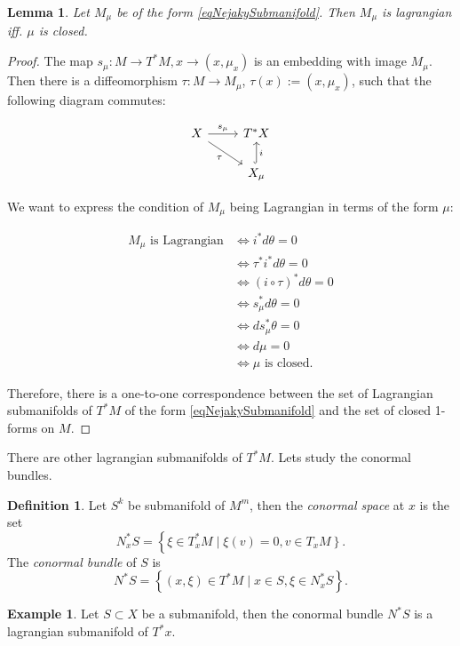 \documentclass{article}
\newtheorem{lemma}[theorem]{Lemma} %
\theoremstyle{definition}
\newtheorem{definition}[theorem]{Definition}
\newtheorem{example}[theorem]{Example}
\begin{document}
\begin{lemma}
    Let $M_\mu$ be of the form \eqref{eqNejakySubmanifold}. Then $M_\mu$ is lagrangian iff. $\mu$ is closed.
\end{lemma}
\begin{proof}
    The map $s_\mu : M \rightarrow T^*M, x \rightarrow (x, \mu_x)$ is an embedding with image $M_\mu$. Then there is a diffeomorphism \( \tau: M \to M_\mu \), \( \tau(x) := (x, \mu_x) \), such that the following diagram commutes:

    \[
    \begin{tikzcd}
        X \arrow[r, "s_\mu"] \arrow[dr, "\tau"'] & T^*X \\
        & X_\mu \arrow[u, hook, "i"']
    \end{tikzcd}
    \]
    
    We want to express the condition of \( M_\mu \) being Lagrangian in terms of the form \( \mu \):

    \begin{equation}
        \begin{aligned}
        M_\mu \text{ is Lagrangian} 
        &\iff i^* d\theta = 0 \\
        &\iff \tau^* i^* d\theta = 0 \\
        &\iff (i \circ \tau)^* d\theta = 0 \\
        &\iff s_\mu^* d\theta = 0 \\
        &\iff d s_\mu^* \theta = 0 \\
        &\iff d\mu = 0 \\
        &\iff \mu \text{ is closed.}
        \end{aligned}
    \end{equation}

    Therefore, there is a one-to-one correspondence between the set of Lagrangian submanifolds of $T^*M$ of the form \eqref{eqNejakySubmanifold} and the set of closed 1-forms on $M$.
\end{proof}

There are other lagrangian submanifolds of $T^*M$. Lets study the conormal bundles.

\begin{definition}
    Let $S^k$ be submanifold of $M^m$, then the \textit{conormal space} at $x$ is the set
    \begin{equation*}
        N_x^* S=\left\{\xi \in T_x^* M \mid \xi(v)=0\right., \left.v \in T_x M\right\}.
    \end{equation*}
    The \textit{conormal bundle} of $S$ is 
    \begin{equation*}
        N^* S=\left\{(x, \xi) \in T^* M \mid x \in S, \xi \in N_x^* S\right\}.
    \end{equation*}
\end{definition}
\begin{example}
    Let $S \subset X$ be a submanifold, then the conormal bundle $N^*S$ is a lagrangian submanifold of $T^*x$.
\end{example}
\end{document}
